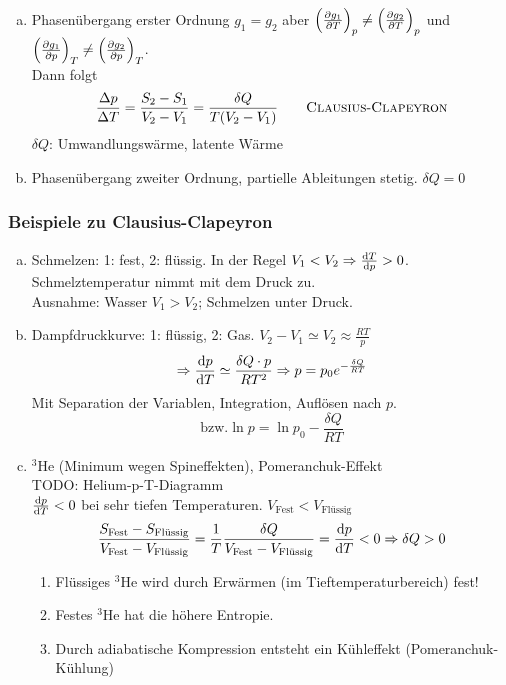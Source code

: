 \begin{enumerate}[a)]
    \item Phasenübergang erster Ordnung $g_1 = g_2$ aber $\left( \frac{\partial g_1}{\partial T} \right)_{p} \neq \left( \frac{\partial g_2}{\partial T} \right)_{p}$ und $\left( \frac{\partial g_1}{\partial p} \right)_{T} \neq \left( \frac{\partial g_2}{\partial p} \right)_{T}$. \\
    Dann folgt
    \begin{equation}
        \frac{\Delta p}{\Delta T} = \frac{S_2 - S_1}{V_2 - V_1} = \frac{\delta Q}{T (V_2 - V_1)} \qquad \text{\textsc{Clausius}-\textsc{Clapeyron}}
    \end{equation}
    $\delta Q$: Umwandlungswärme, latente Wärme
    \item Phasenübergang zweiter Ordnung, partielle Ableitungen stetig. $\delta Q = 0$
\end{enumerate}
\subsubsection{Beispiele zu Clausius-Clapeyron}
\begin{enumerate}[a)]
    \item Schmelzen: 1: fest, 2: flüssig. In der Regel $V_1 < V_2 \Rightarrow \frac{\mathrm{d} T}{\mathrm{d} p} > 0$. Schmelztemperatur nimmt mit dem Druck
    zu. \\
    Ausnahme: Wasser $V_1 > V_2$; Schmelzen unter Druck.
    \item Dampfdruckkurve: 1: flüssig, 2: Gas. $V_2 - V_1 \simeq V_2 \approx \frac{R T}{p}$
    \begin{equation}
        \Rightarrow \frac{\mathrm{d} p}{\mathrm{d} T} \simeq \frac{\delta Q \cdot p}{R T^2} \Rightarrow p = p_0 e^{- \frac{\delta Q}{R T}}
    \end{equation}
    Mit Separation der Variablen, Integration, Auflösen nach $p$.
    \begin{equation}
        \text{bzw.} \ln p = \ln p_0 - \frac{\delta Q}{R T}
    \end{equation}
    \item ${}^3\text{He}$ (Minimum wegen Spineffekten), Pomeranchuk-Effekt \\
    TODO: Helium-p-T-Diagramm \\ %
    $\frac{\mathrm{d} p}{\mathrm{d} T} < 0$ bei sehr tiefen Temperaturen. $V_\text{Fest} < V_\text{Flüssig}$
    \begin{equation}
        \frac{S_\text{Fest} - S_\text{Flüssig}}{V_\text{Fest} - V_\text{Flüssig}} = \frac{1}{T} \frac{\delta Q}{V_\text{Fest} - V_\text{Flüssig}} =
        \frac{\mathrm{d} p}{\mathrm{d} T} < 0 \Rightarrow \delta Q > 0
    \end{equation}
    \begin{enumerate}[1.]
        \item Flüssiges ${}^3\text{He}$ wird durch Erwärmen (im Tieftemperaturbereich) fest!
        \item Festes ${}^3\text{He}$ hat die höhere Entropie.
        \item Durch adiabatische Kompression entsteht ein Kühleffekt (Pomeranchuk-Kühlung)
    \end{enumerate}
\end{enumerate}

